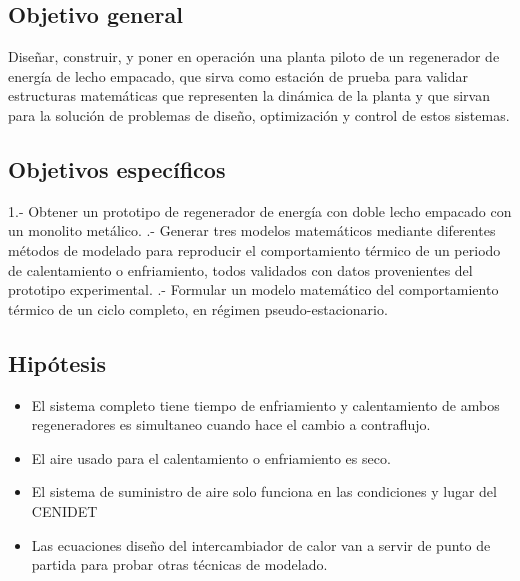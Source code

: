 \subsection{Objetivo general}
Diseñar, construir, y poner en operaci\'on una planta piloto de un regenerador de energ\'ia de lecho empacado, que sirva como estaci\'on de prueba para validar estructuras matem\'aticas que representen la din\'amica de la
planta y que sirvan para la soluci\'on de problemas de diseño, optimizaci\'on y control de estos sistemas.
\subsection{Objetivos espec\'ificos}
1.- Obtener un prototipo de regenerador de energ\'ia con doble lecho empacado con un monolito met\'alico.
.- Generar tres modelos matem\'aticos mediante diferentes m\'etodos de modelado para reproducir el
comportamiento t\'ermico de un periodo de calentamiento o enfriamiento, todos validados con datos
provenientes del prototipo experimental.
.- Formular un modelo matem\'atico del comportamiento t\'ermico de un ciclo completo, en r\'egimen pseudo-estacionario.
\subsection{Hip\'otesis}
\begin{itemize}
	\item El sistema completo tiene tiempo de enfriamiento y calentamiento de ambos regeneradores es simultaneo cuando hace el cambio a contraflujo.
	\item El aire usado para el calentamiento o enfriamiento es seco.
	\item El sistema de suministro de aire solo funciona en las condiciones y lugar del CENIDET
	\item Las ecuaciones dise\~{n}o del intercambiador de calor van a servir de punto de partida para probar otras t\'ecnicas de modelado.
\end{itemize}

